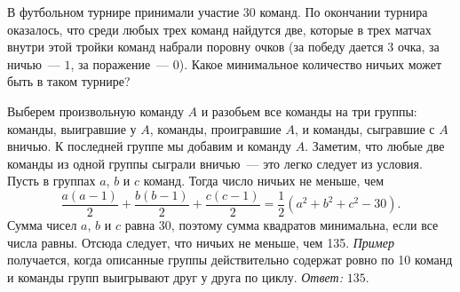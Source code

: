 В футбольном турнире принимали участие $30$ команд.
По окончании турнира оказалось, что среди любых трех команд найдутся две,
которые в трех матчах внутри этой тройки команд набрали поровну очков
(за победу дается $3$ очка, за ничью~--- $1$, за поражение~--- $0$).
Какое минимальное количество ничьих может быть в таком турнире?

\solution
Выберем произвольную команду $A$ и разобьем все команды на три группы:
команды, выигравшие у $A$, команды, проигравшие $A$, и команды, сыгравшие с
$A$ вничью.
К последней группе мы добавим и команду $A$.
Заметим, что любые две команды из одной группы сыграли вничью~--- это легко
следует из условия.
Пусть в группах $a$, $b$ и $c$ команд.
Тогда число ничьих не меньше, чем
\[
    \dfrac{a (a - 1)}{2} +
    \dfrac{b (b - 1)}{2} +
    \dfrac{c (c - 1)}{2}
=
    \dfrac{1}{2}(a^2 + b^2 + c^2 - 30)
.\]
Сумма чисел $a$, $b$ и $c$ равна 30, поэтому сумма квадратов минимальна, если
все числа равны.
Отсюда следует, что ничьих не меньше, чем 135.
\emph{Пример} получается, когда описанные группы действительно содержат ровно по 10
команд и команды групп выигрывают друг у друга по циклу.
\emph{Ответ:} $135$.

